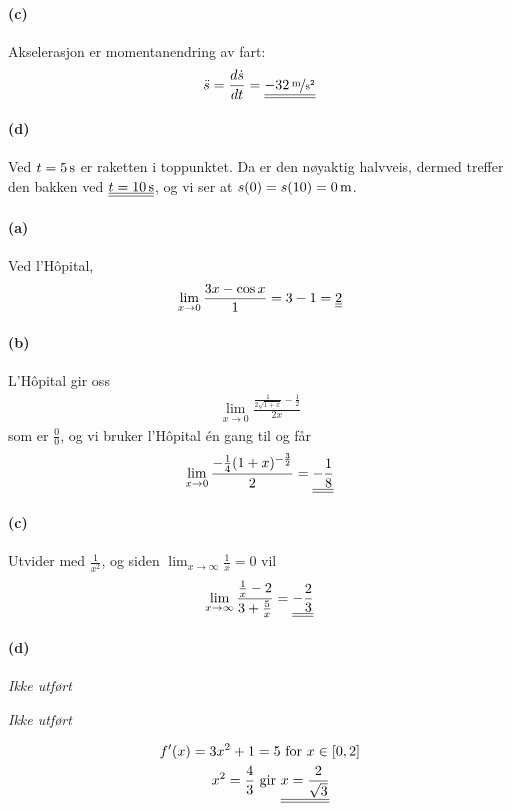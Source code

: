 \documentclass[a4paper,norsk,12pt]{article}
\begin{document}
\paragraph{(c)}
Akselerasjon er momentanendring av fart:
\begin{align*}
  \ddot{s} = \frac{d\dot{s}}{dt} = \svar{\unitfrac[-32]{m}{s^2}}
\end{align*}

\paragraph{(d)}
Ved $t=\unit[5]{s}$ er raketten i toppunktet. Da er den nøyaktig halvveis,
dermed treffer den bakken ved $\svar{t=\unit[10]{s}}$, og vi ser at
$s(0) = s(10) = \unit[0]{m}$.

\paragraph{(a)}
Ved l'Hôpital,
\begin{align*}
  \lim_{x\to 0}{\frac{3x-\cos{x}}{1}} = 3 - 1 = {\underline{\underline{2}}}
\end{align*}

\paragraph{(b)}
L'Hôpital gir oss
\begin{align*}
  \lim_{x\to 0}\frac{ \frac{1}{2\sqrt{1+x}} -\frac{1}{2} }{2x}
\end{align*}
som er $\frac{0}{0}$, og vi bruker l'Hôpital én gang til og får
\begin{align*}
  \lim_{x\to 0}\frac{ -\frac{1}{4}(1+x)^{-\frac{3}{2}} }{2} =
    {\underline{\underline{-\frac{1}{8}}}}
\end{align*}

\paragraph{(c)}
Utvider med $\frac{1}{x^2}$, og siden $\lim_{x\to\infty}\frac{1}{x} = 0$ vil
\begin{align*}
  \lim_{x\to\infty}{\frac{\frac{1}{x}-2}{3+\frac{5}{x}}} = {\underline{\underline{-\frac{2}{3}}}} \\
\end{align*}

\paragraph{(d)}
\textit{Ikke utført}

\textit{Ikke utført}

\begin{align*}
  f'(x) = 3x^2 + 1 & = 5 \text{ for } x \in [0,2]\\
  x^2 = \frac{4}{3} & \text{ gir }
  \svar{x = \frac{2}{\sqrt{3}}}
\end{align*}
\end{document}
